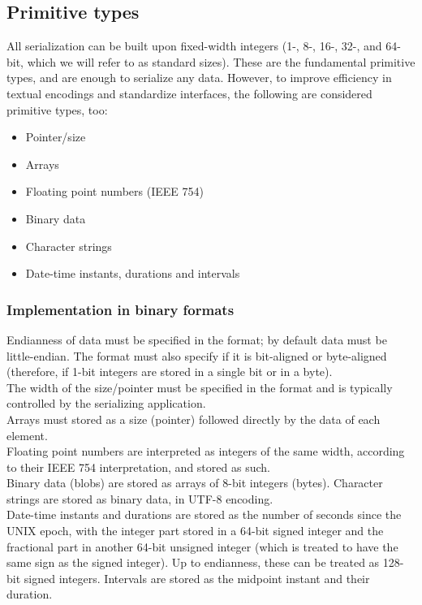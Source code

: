 \subsection{Primitive types}
All serialization can be built upon fixed-width integers (1-, 8-, 16-, 32-, and 64-bit, which we will refer to as standard sizes). These are the fundamental primitive types, and are enough to serialize any data. However, to improve efficiency in textual encodings and standardize interfaces, the following are considered primitive types, too:
\begin{itemize}
	\item Pointer/size
	\item Arrays
	\item Floating point numbers (IEEE 754)
	\item Binary data
	\item Character strings
	\item Date-time instants, durations and intervals
\end{itemize}
\subsubsection{Implementation in binary formats}
Endianness of data must be specified in the format; by default data must be little-endian. The format must also specify if it is bit-aligned or byte-aligned (therefore, if 1-bit integers are stored in a single bit or in a byte).\\
The width of the size/pointer must be specified in the format and is typically controlled by the serializing application.\\
Arrays must stored as a size (pointer) followed directly by the data of each element.\\
Floating point numbers are interpreted as integers of the same width, according to their IEEE 754 interpretation, and stored as such.\\
Binary data (blobs) are stored as arrays of 8-bit integers (bytes).
Character strings are stored as binary data, in UTF-8 encoding.\\
Date-time instants and durations are stored as the number of seconds since the UNIX epoch, with the integer part stored in a 64-bit signed integer and the fractional part in another 64-bit unsigned integer (which is treated to have the same sign as the signed integer). Up to endianness, these can be treated as 128-bit signed integers. Intervals are stored as the midpoint instant and their duration.
